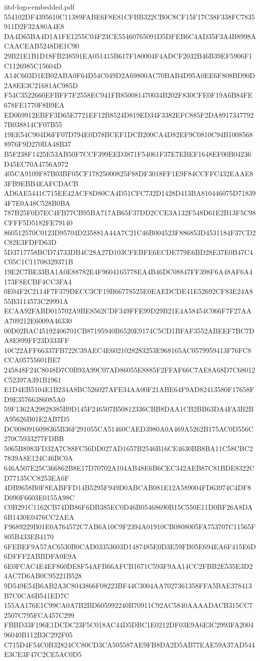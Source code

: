 \begin{filecontents*}[overwrite]{iitd-logo-embedded.pdf}
554102DF4395610C11389FABE6F8E81CFBB322CB0C8CF15F17C38F338FC7835911D2F32A80A4E8
DA4D65BA4D1A1FE1255C04F23CE55460765091D5DFEB6C4AD35F3A4B8998ACAACEAB5248DE1C90
29B21E1B1D18FB238591EA051415B617F180004F4ADCF2032B46B39EF5906F1C1126985C15604D
A14C603D1EB02ABA0F64D54C049D2A69800AC70BAB4D95A0EE6F808BD90D2A8EE3C21681AC985D
F54C3522660EFBFF7F2558EC941FB850081470034B202F830CFE0F19A6B84FE678FE1770F8B9EA
ED069912EBFF3D65E7721EF12B8524D819ED34F3382EFC885F2DA89173477927B038814CF07B55
19EE54C904D6FF07D794E0D78BCEF1DCB200CA4D82EF9C0810C94B10085688976F9D270BA48B37
B5F238F1425E53AB50F7CCF399EED3871F54061F37E7EBEF1648EF00B04236D45EC70A4756A972
405CA9109F87B03BF05CF17825000825F88DF3018FF1E9F84CCFFC432EAAE83FB9EBB4EAFCDACB
AD6AE5441C715EE42ACF8D80CA4D51CFC732D1428D413BA810446075D718394F7E0A48C528B0BA
787B25F0D7EC4FB77CB95BA717AB65F37DD2CCE3A132F548D61E2B13F5C98CFFF5D5182FE79140
860512570C0123D95704D235881A44A7C21C46B004523F886853D4531184F37CD2C82E3FDFD63D
5D3717758BCD74733DB4C28A27D103CFEBFE6ECDE779E6BD28E37E0B47C4C05C1C11708329371B
19E2C7BE33BA1A0E88782E4F9604165778EA4B46DC08847FF398F6A48AF6A4173F8ECBF4CC3FA4
0E04F2C2114F7F379DECC3CF19B66778525E0EAEDCDE41E52692CF83E24A855B3114573C29991A
ECAA92FABD015702A9BE8562CDF349FFE99D29B21E4A58454C066F7F27AAA709212E6009A46330
00D02BAC45192406701CB87195940B6520E9174C5CD1BFAF3552ABEEF7BC7DA8E899FF23D333FF
10C22AFF66337FB722C39AEC4E6021028283253E968165AC0579959413F76FC8CCA05755601BE7
245848F24C8048D7C0B93A99C07AD86055E8885F2FFAF66C7AE8A68D7C68012C52397A391B1961
E1D4EB5104E1B234A8BC526027AFE34AA00F21ABE64F9AD82413580F17658FD9E35766386085A0
59F1362A29828385B9D145F246507B50812336CBB8DAA1CB2BB63DA4FA3B2BA95626B01E2AB7D5
DC0080916098365B36F291055CA51460CAED3980A0A469A5262B175AC0D556C270C5933277FDBB
5065B8983FD32A7C88FC56DD027AD1657B2546B16CE4630BB8BA11C58CBC27839A8E124C46BC0A
646A507E25C366862B8E17D70702A104AB48E6B6CEC342AEB87C81BDE8322CD77135CC8253EA6F
4DB9658B0F8EABFFD14B5295F949D0ABCAB081E12A589004FD63974C4DF8D090F6603E0155A98C
C0B291C1162CB74DB86F6DB385EC0D46B05468690B15C550E11D0BF26A8DA6B1430E0476CC2AEA
F9689229B01E0A764572C7AB6A10C9F2394A01910CB0808005FA753707C11565F805B433EB4170
6FEBEF9A57AC6530B0CAD03353603D1487485E0D3E59FB05E694EA6F415E6D6DFFF2ABBDFA0E9A
6E0FCAC4E4EF860DE8F54AFB66AFCB1671C593F9AA14CC2FBB2E535E3D24AC7D6AB0C95221B528
9D549E54B6AB2A3C8043866F08223BF44C3004AA7027361358FFA5BAE378413B7C0CA6B541ED7C
155AA176E1C99CA0A7B2BD605992240B70911C92AC5840AAAADACB315CC72507C795FCA457C299
FBBD33F196E1DCDC23F5C018AC44D5DBC1E0212DF03E9A6E3C2993FA200496040B112B3C292F05
C715D4F54C0B32824CC80CD3CA505587AE9FB8DA2D5AB77EAE59A37AD544E3CE3F47C2CE5AC0D5

\end{filecontents*}
